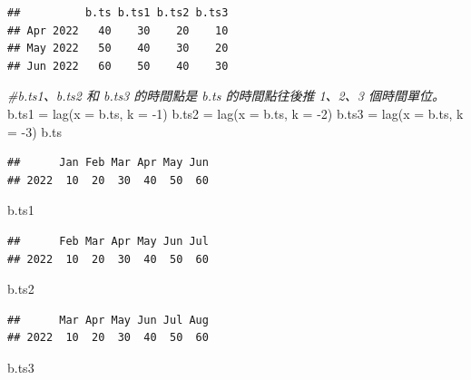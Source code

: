 \documentclass[
]{book}
\newenvironment{Shaded}{\begin{snugshade}}{\end{snugshade}}
\newcommand{\AttributeTok}[1]{\textcolor[rgb]{0.77,0.63,0.00}{#1}}
\newcommand{\CommentTok}[1]{\textcolor[rgb]{0.56,0.35,0.01}{\textit{#1}}}
\newcommand{\DecValTok}[1]{\textcolor[rgb]{0.00,0.00,0.81}{#1}}
\newcommand{\FunctionTok}[1]{\textcolor[rgb]{0.00,0.00,0.00}{#1}}
\newcommand{\NormalTok}[1]{#1}
\newcommand{\OtherTok}[1]{\textcolor[rgb]{0.56,0.35,0.01}{#1}}
\newcommand{\SpecialCharTok}[1]{\textcolor[rgb]{0.00,0.00,0.00}{#1}}
\theoremstyle{definition}
\theoremstyle{definition}
\theoremstyle{definition}
\theoremstyle{definition}
\theoremstyle{remark}
\begin{document}
\begin{verbatim}
##          b.ts b.ts1 b.ts2 b.ts3
## Apr 2022   40    30    20    10
## May 2022   50    40    30    20
## Jun 2022   60    50    40    30
\end{verbatim}

\begin{Shaded}
\begin{Highlighting}[]
\CommentTok{\#b.ts1、b.ts2 和 b.ts3 的時間點是 b.ts 的時間點往後推 1、2、3 個時間單位。}
\NormalTok{b.ts1 }\OtherTok{=} \FunctionTok{lag}\NormalTok{(}\AttributeTok{x =}\NormalTok{ b.ts, }\AttributeTok{k =} \SpecialCharTok{{-}}\DecValTok{1}\NormalTok{)}
\NormalTok{b.ts2 }\OtherTok{=} \FunctionTok{lag}\NormalTok{(}\AttributeTok{x =}\NormalTok{ b.ts, }\AttributeTok{k =} \SpecialCharTok{{-}}\DecValTok{2}\NormalTok{)}
\NormalTok{b.ts3 }\OtherTok{=} \FunctionTok{lag}\NormalTok{(}\AttributeTok{x =}\NormalTok{ b.ts, }\AttributeTok{k =} \SpecialCharTok{{-}}\DecValTok{3}\NormalTok{)}
\NormalTok{b.ts}
\end{Highlighting}
\end{Shaded}

\begin{verbatim}
##      Jan Feb Mar Apr May Jun
## 2022  10  20  30  40  50  60
\end{verbatim}

\begin{Shaded}
\begin{Highlighting}[]
\NormalTok{b.ts1}
\end{Highlighting}
\end{Shaded}

\begin{verbatim}
##      Feb Mar Apr May Jun Jul
## 2022  10  20  30  40  50  60
\end{verbatim}

\begin{Shaded}
\begin{Highlighting}[]
\NormalTok{b.ts2}
\end{Highlighting}
\end{Shaded}

\begin{verbatim}
##      Mar Apr May Jun Jul Aug
## 2022  10  20  30  40  50  60
\end{verbatim}

\begin{Shaded}
\begin{Highlighting}[]
\NormalTok{b.ts3}
\end{Highlighting}
\end{Shaded}
\end{document}
